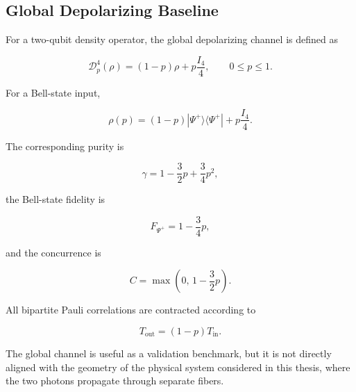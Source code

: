 
\subsection{Global Depolarizing Baseline}
\label{subsec:global_depolarizing_baseline}

For a two-qubit density operator, the global depolarizing channel is defined as

\begin{equation}
\mathcal{D}^{4}_p(\rho)
=
(1-p)\rho
+
p\frac{I_4}{4},
\qquad
0\leq p\leq1.
\label{eq:global_two_qubit_depolarizing_channel}
\end{equation}

For a Bell-state input,

\begin{equation}
\rho(p)
=
(1-p)
|\Psi^+\rangle\langle\Psi^+|
+
p\frac{I_4}{4}.
\label{eq:globally_depolarized_bell_state}
\end{equation}

The corresponding purity is

\begin{equation}
\gamma
=
1-\frac{3}{2}p+\frac{3}{4}p^2,
\label{eq:global_depolarizing_purity}
\end{equation}

the Bell-state fidelity is

\begin{equation}
F_{\Psi^+}
=
1-\frac{3}{4}p,
\label{eq:global_depolarizing_fidelity}
\end{equation}

and the concurrence is

\begin{equation}
C
=
\max
\left(
0,\,
1-\frac{3}{2}p
\right).
\label{eq:global_depolarizing_concurrence}
\end{equation}

All bipartite Pauli correlations are contracted according to

\begin{equation}
T_{\mathrm{out}}
=
(1-p)T_{\mathrm{in}}.
\label{eq:global_depolarizing_tensor}
\end{equation}

The global channel is useful as a validation benchmark, but it is not directly
aligned with the geometry of the physical system considered in this thesis, where
the two photons propagate through separate fibers.

